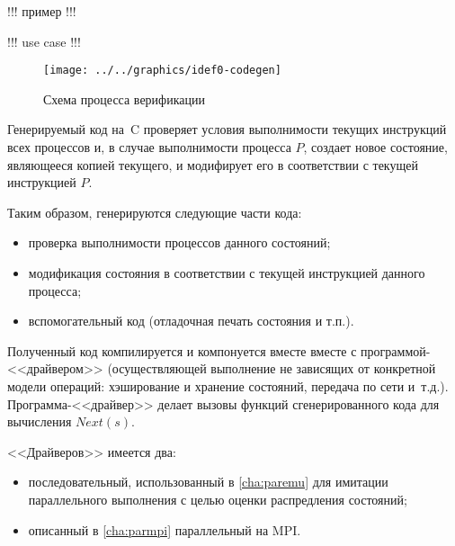 
!!! пример !!!

!!! use case !!! 

\begin{figure}[ht]
  \centering
  \texttt{[image: ../../graphics/idef0-codegen]}  
  \caption{Схема процесса верификации}
\label{fig:idef0-codegen}
\end{figure}

Генерируемый код на~C проверяет условия выполнимости текущих инструкций всех процессов и,
в случае выполнимости процесса $P$, создает новое состояние, являющееся копией текущего, и
модифирует его в соответствии с текущей инструкцией $P$.

Таким образом, генерируются следующие части кода:

\begin{itemize}
\item проверка выполнимости процессов данного состояний;
\item модификация состояния в соответствии с текущей инструкцией данного процесса;
\item вспомогательный код (отладочная печать состояния и т.п.).
\end{itemize}

Полученный код компилируется и компонуется вместе вместе с программой-<<драйвером>>
(осуществляющей выполнение не зависящих от конкретной модели операций: хэширование и
хранение состояний, передача по сети и~т.д.). Программа-<<драйвер>> делает вызовы функций
сгенерированного кода для вычисления $Next(s)$.

<<Драйверов>> имеется два: 

\begin{itemize}
\item последовательный, использованный в \ref{cha:paremu} для имитации параллельного
  выполнения с целью оценки распредления состояний;
\item описанный в \ref{cha:parmpi} параллельный на MPI.
\end{itemize}

